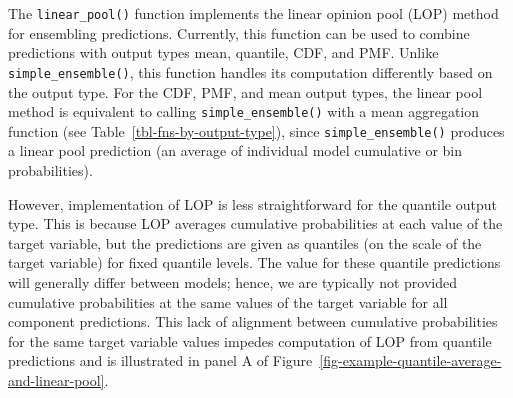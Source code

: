\documentclass[
  article,
  shortnames,
  notitle]{jss}
\begin{document}
The \texttt{linear\_pool()} function implements the linear opinion pool
(LOP) method for ensembling predictions. Currently, this function can be
used to combine predictions with output types mean, quantile, CDF, and
PMF. Unlike \texttt{simple\_ensemble()}, this function handles its
computation differently based on the output type. For the CDF, PMF, and
mean output types, the linear pool method is equivalent to calling
\texttt{simple\_ensemble()} with a mean aggregation function (see
Table~\ref{tbl-fns-by-output-type}), since \texttt{simple\_ensemble()}
produces a linear pool prediction (an average of individual model
cumulative or bin probabilities).

However, implementation of LOP is less straightforward for the quantile
output type. This is because LOP averages cumulative probabilities at
each value of the target variable, but the predictions are given as
quantiles (on the scale of the target variable) for fixed quantile
levels. The value for these quantile predictions will generally differ
between models; hence, we are typically not provided cumulative
probabilities at the same values of the target variable for all
component predictions. This lack of alignment between cumulative
probabilities for the same target variable values impedes computation of
LOP from quantile predictions and is illustrated in panel A of
Figure~\ref{fig-example-quantile-average-and-linear-pool}.
\end{document}
